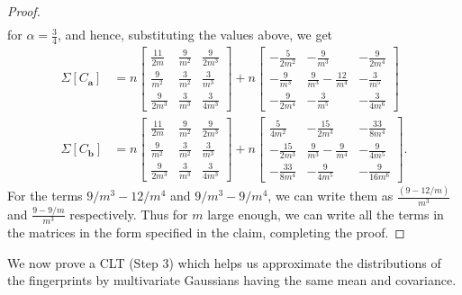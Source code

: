 \documentclass[10pt]{article} %
\theoremstyle{plain}
\newcommand{\ba}{\textbf{a}}
\newcommand{\bb}{\textbf{b}}
\begin{document}
\begin{proof}
\begin{align*}
	\end{align*}
	for $\alpha = \frac34$, and hence, substituting the values above, we get
	\begin{align*}
		\Sigma[C_\ba] &= 
		n\begin{bmatrix}
			\frac{11}{2m} & \frac{9}{m^2} & \frac{9}{2m^3}\\
			\frac{9}{m^2} & \frac{3}{m^2} & \frac{3}{m^3} \\
			\frac{9}{2m^3} & \frac{3}{m^3} & \frac{3}{4m^3}
		\end{bmatrix}
		+
		n\begin{bmatrix}
			-\frac{5}{2m^2}  & -\frac{9}{m^3} & -\frac{9}{2m^4}\\
			-\frac{9}{m^3} & \frac{9}{m^3}-\frac{12}{m^4} & -\frac{3}{m^5} \\
			-\frac{9}{2m^4} & -\frac{3}{m^5} & -\frac{3}{4m^6}
		\end{bmatrix} \\
		\Sigma[C_\bb] &=
		n\begin{bmatrix}
			\frac{11}{2m} & \frac{9}{m^2} & \frac{9}{2m^3}\\
			\frac{9}{m^2} & \frac{3}{m^2} & \frac{3}{m^3} \\
			\frac{9}{2m^3} & \frac{3}{m^3} & \frac{3}{4m^3}
		\end{bmatrix}
		+
		n\begin{bmatrix}
			\frac{5}{4m^2} & - \frac{15}{2m^3} & -\frac{33}{8m^4}\\
			- \frac{15}{2m^3} & \frac{9}{m^3}-\frac{9}{m^4} & -\frac{9}{4m^5} \\
			-\frac{33}{8m^4} & -\frac{9}{4m^5} & -\frac{9}{16m^6}
		\end{bmatrix}.
	\end{align*}
	For the terms $9/m^3 - 12/m^4$ and $9/m^3 - 9/m^4$,  we can write them as $\frac{(9-12/m)}{m^3}$ and $\frac{9 - 9/m}{m^3}$ respectively.  Thus for $m$ large enough, we can write all the terms in the matrices in the form specified in the claim, completing the proof. 
\end{proof}

We now prove a CLT (Step 3) which helps us approximate the distributions of the fingerprints by multivariate Gaussians having the same mean and covariance.
\end{document}
